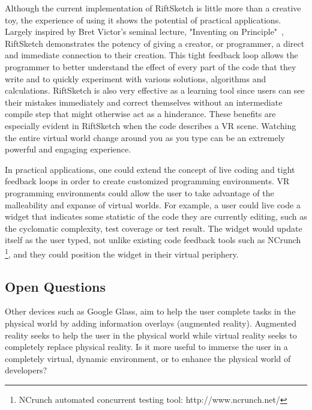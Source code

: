 \documentclass[conference]{IEEEtran}
\begin{document}
Although the current implementation of RiftSketch is little more than a creative toy, the experience of using it shows the potential of practical applications. 
Largely inspired by Bret Victor's seminal lecture, "Inventing on Principle"~\cite{Victor:InventingOnPrincipleVideo}\cite{Victor:InventingOnPrincipleTranscript}, RiftSketch demonstrates the potency of giving a creator, or programmer, a direct and immediate connection to their creation. 
This tight feedback loop allows the programmer to better understand the effect of every part of the code that they write and to quickly experiment with various solutions, algorithms and calculations. 
RiftSketch is also very effective as a learning tool since users can see their mistakes immediately and correct themselves without an intermediate compile step that might otherwise act as a hinderance.  
These benefits are especially evident in RiftSketch when the code describes a VR scene. 
Watching the entire virtual world change around you as you type can be an extremely powerful and engaging experience.

In practical applications, one could extend the concept of live coding and tight feedback loops in order to create customized programming environments. 
VR programming environments could allow the user to take advantage of the malleability and expanse of virtual worlds. 
For example, a user could live code a widget that indicates some statistic of the code they are currently editing, such as the cyclomatic complexity, test coverage or test result. 
The widget would update itself as the user typed, not unlike existing code feedback tools such as NCrunch \footnote{NCrunch automated concurrent testing tool: http://www.ncrunch.net/}, and they could position the widget in their virtual periphery.

\subsection{Open Questions}

Other devices such as Google Glass, aim to help the user complete tasks in the physical world by adding information overlays (augmented reality). 
Augmented reality seeks to help the user in the physical world while virtual reality seeks to completely replace physical reality. 
Is it more useful to immerse the user in a completely virtual, dynamic environment, or to enhance the physical world of developers?
  
\end{document}
